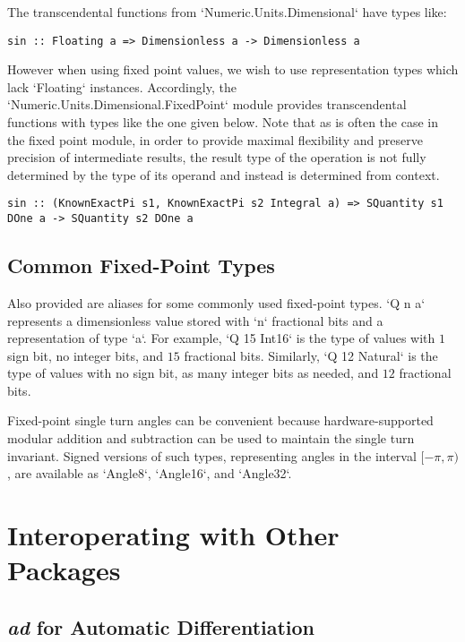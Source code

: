 \documentclass[11pt]{report}
\newcommand{\packagename}[1]{\textit{#1}}
\begin{document}
The transcendental functions from `Numeric.Units.Dimensional` have types like:

\begin{lstlisting}
sin :: Floating a => Dimensionless a -> Dimensionless a
\end{lstlisting}

However when using fixed point values, we wish to use representation types which lack `Floating` instances. Accordingly,
the `Numeric.Units.Dimensional.FixedPoint` module provides transcendental functions with types like the one given below.
Note that as is often the case in the fixed point module, in order to provide maximal flexibility and preserve precision of
intermediate results, the result type of the operation is not fully determined by the type of its operand and instead is
determined from context.

\begin{lstlisting}
sin :: (KnownExactPi s1, KnownExactPi s2 Integral a) => SQuantity s1 DOne a -> SQuantity s2 DOne a
\end{lstlisting}

\section{Common Fixed-Point Types}

Also provided are aliases for some commonly used fixed-point types. `Q n a` represents a dimensionless value stored with `n` fractional bits
and a representation of type `a`. For example, `Q 15 Int16` is the type of values with $ 1 $ sign bit, no integer bits, and $ 15 $ fractional bits.
Similarly, `Q 12 Natural` is the type of values with no sign bit, as many integer bits as needed, and $ 12 $ fractional bits.

Fixed-point single turn angles can be convenient because hardware-supported modular addition and subtraction can be used to maintain the
single turn invariant. Signed versions of such types, representing angles in the interval $ [-\pi, \pi) $, are available as `Angle8`, `Angle16`,
and `Angle32`.




\chapter{Interoperating with Other Packages}

\section{\packagename{ad} for Automatic Differentiation}
\end{document}
